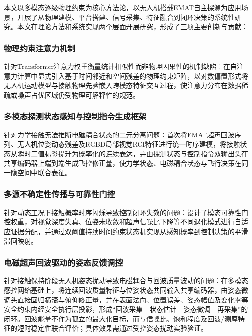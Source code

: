 本文以多模态逐级物理约束为核心方法论，以无人机搭载EMAT自主探测为应用场景，开展了从物理建模、平台搭建、信号采集、特征融合到闭环决策的系统性研究。本文在理论方法和系统实现两个层面开展研究，形成了三项主要创新与贡献：

\subsubsection{物理约束注意力机制}

针对Transformer注意力权重衡量统计相似性而非物理因果性的机制缺陷：在自注意力计算中显式引入基于时间邻近和空间残差的物理约束矩阵，以对数偏置形式将无人机运动模型与接触物理先验嵌入跨模态特征交互过程，使注意力分布在数据稀疏或噪声占优区域仍受物理可解释性的规范。

\subsubsection{多模态探测状态感知与控制指令生成框架}

针对力学接触无法推断电磁耦合状态的二元分离问题：首次将EMAT超声回波序列、无人机位姿动态残差及RGBD局部视觉ROI特征进行统一时序建模，将接触状态从瞬时二值标签提升为概率化的连续表达，并由探测状态与控制指令双输出头在共享编码器上端到端生成飞控修正量，使力学状态、电磁耦合状态与飞行决策在同一隐空间中联合表征。

\subsubsection{多源不确定性传播与可靠性门控}

针对动态工况下接触概率时序闪烁导致控制闭环失效的问题：设计了模态可靠性门控权重，对视觉深度失真、位姿未收敛和超声信噪比下降等不同退化模式进行自适应证据分配，并通过双阈值持续时间约束状态机实现从感知概率到控制决策的平滑滞回映射。

\subsubsection{电磁超声回波驱动的姿态反馈调控}

针对接触保持阶段无人机姿态扰动导致电磁耦合与回波质量波动的问题：在多模态感控网络基础上，将连续回波质量特征与位姿状态共同输入共享编码器，由姿态微调头直接回归横滚与俯仰修正量，并在表面法向、位置误差、姿态幅值及变化率等安全约束内经安全执行层投影，形成“回波采集—状态估计—姿态微调—再采集”的闭环。回波能量不作为孤立的最大化目标，而与信噪比、饱和程度及回波/测厚特征的短时稳定性联合评价；具体效果需通过受控姿态扰动实验验证。

